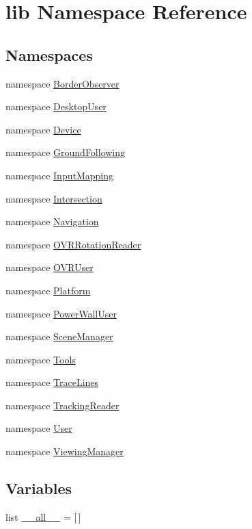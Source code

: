 \hypertarget{namespacelib}{\section{lib \-Namespace \-Reference}
\label{namespacelib}
}
\subsection*{\-Namespaces}
\begin{DoxyCompactItemize}
\item 
namespace \hyperlink{namespacelib_1_1BorderObserver}{\-Border\-Observer}
\item 
namespace \hyperlink{namespacelib_1_1DesktopUser}{\-Desktop\-User}
\item 
namespace \hyperlink{namespacelib_1_1Device}{\-Device}
\item 
namespace \hyperlink{namespacelib_1_1GroundFollowing}{\-Ground\-Following}
\item 
namespace \hyperlink{namespacelib_1_1InputMapping}{\-Input\-Mapping}
\item 
namespace \hyperlink{namespacelib_1_1Intersection}{\-Intersection}
\item 
namespace \hyperlink{namespacelib_1_1Navigation}{\-Navigation}
\item 
namespace \hyperlink{namespacelib_1_1OVRRotationReader}{\-O\-V\-R\-Rotation\-Reader}
\item 
namespace \hyperlink{namespacelib_1_1OVRUser}{\-O\-V\-R\-User}
\item 
namespace \hyperlink{namespacelib_1_1Platform}{\-Platform}
\item 
namespace \hyperlink{namespacelib_1_1PowerWallUser}{\-Power\-Wall\-User}
\item 
namespace \hyperlink{namespacelib_1_1SceneManager}{\-Scene\-Manager}
\item 
namespace \hyperlink{namespacelib_1_1Tools}{\-Tools}
\item 
namespace \hyperlink{namespacelib_1_1TraceLines}{\-Trace\-Lines}
\item 
namespace \hyperlink{namespacelib_1_1TrackingReader}{\-Tracking\-Reader}
\item 
namespace \hyperlink{namespacelib_1_1User}{\-User}
\item 
namespace \hyperlink{namespacelib_1_1ViewingManager}{\-Viewing\-Manager}
\end{DoxyCompactItemize}
\subsection*{\-Variables}
\begin{DoxyCompactItemize}
\item 
list \hyperlink{namespacelib_aea9928ff3917bdb79279987499bb64bb}{\-\_\-\-\_\-all\-\_\-\-\_\-} = \mbox{[}$\,$\mbox{]}
\end{DoxyCompactItemize}


